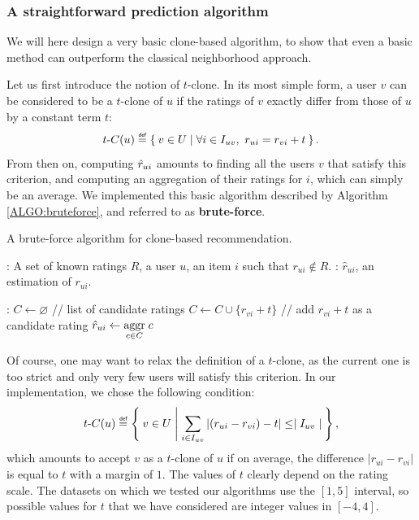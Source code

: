 \subsubsection{A straightforward prediction algorithm}
\label{STRAIGHTFORWARD}

We will here design a very basic clone-based algorithm, to show that even a
basic method can outperform the classical neighborhood approach.

Let us first introduce the notion of $t$-clone. In its most simple form, a
user $v$ can be considered to be a $t$-clone of $u$ if the ratings of $v$
exactly differ from those of $u$ by a constant term $t$:
$$
t\text{-}C(u) \eqdef \Set{v \in U | \forall i \in I_{uv},~ r_{ui} = r_{vi} + t}.
$$
From then on, computing $\hat{r}_{ui}$ amounts to finding all the users $v$ that
satisfy this criterion, and computing an aggregation of their ratings for $i$,
which can simply be an average. We implemented this basic algorithm described
by Algorithm \ref{ALGO:bruteforce}, and referred to as \textbf{brute-force}.

 \begin{algorithm}[!ht]
   \caption{A brute-force algorithm for clone-based recommendation.}
       \label{ALGO:bruteforce}
       \begin{algorithmic}

      : A set of known ratings $R$, a user $u$, an item
      $i$ such that $r_{ui} \notin R$.
      : $\hat{r}_{ui}$, an estimation of $r_{ui}$.

      :
      \STATE $C \leftarrow \varnothing$ \quad \quad // list of candidate ratings
          \STATE $C \gets C \cup \{r_{vi} + t\}$ \quad // add $r_{vi} + t$ as a candidate rating
          \ENDIF
        \ENDFOR
	    \ENDFOR
    \STATE $\hat{r}_{ui} \leftarrow \underset{c \in C}{\operatorname{aggr}}\; c$
\end{algorithmic}
\end{algorithm}

Of course, one may want to relax the definition of a $t$-clone, as the current
one is too strict and only very few users will satisfy this criterion. In our
implementation, we chose the following condition:
$$
t\text{-}C(u) \eqdef \Set{v \in U |  \sum_{i \in I_{uv}} |(r_{ui} - r_{vi}) -
t| \leq \mid I_{uv}\mid},$$
which amounts to accept $v$ as a $t$-clone of $u$ if on average, the
difference $|r_{ui} - r_{vi}|$ is equal to $t$ with a margin of $1$.
The values of $t$ clearly depend on the rating scale. The datasets on which we
tested our algorithms use the $[1, 5]$ interval, so possible values for $t$
that we have considered are integer values in $[-4, 4]$.

